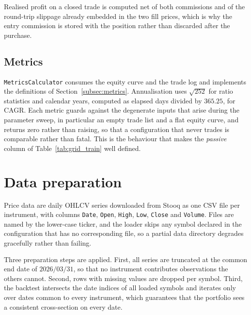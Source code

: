 \begin{listing}[!htbp]
\inputminted[linenos, frame=single, breaklines, fontsize=\footnotesize]{python}{other/portfolio_buy.py}
\caption{Entry-side accounting in the portfolio simulator, including slippage, commission and the one-way buy tax.}
\label{lst:portfolio_buy}
\end{listing}

Realised profit on a closed trade is computed net of both commissions and of the round-trip slippage already embedded in the two fill prices, which is why the entry commission is stored with the position rather than discarded after the purchase.

\subsection{Metrics}\label{subsec:metrics_impl}

\texttt{MetricsCalculator} consumes the equity curve and the trade log and implements the definitions of Section~\ref{subsec:metrics}. Annualisation uses $\sqrt{252}$ for ratio statistics and calendar years, computed as elapsed days divided by $365.25$, for CAGR. Each metric guards against the degenerate inputs that arise during the parameter sweep, in particular an empty trade list and a flat equity curve, and returns zero rather than raising, so that a configuration that never trades is comparable rather than fatal. This is the behaviour that makes the \emph{passive} column of Table~\ref{tab:grid_train} well defined.

\section{Data preparation}\label{sec:data_pipeline}

Price data are daily OHLCV series downloaded from Stooq \cite{stooq} as one CSV file per instrument, with columns \texttt{Date}, \texttt{Open}, \texttt{High}, \texttt{Low}, \texttt{Close} and \texttt{Volume}. Files are named by the lower-case ticker, and the loader skips any symbol declared in the configuration that has no corresponding file, so a partial data directory degrades gracefully rather than failing.

Three preparation steps are applied. First, all series are truncated at the common end date of $2026/03/31$, so that no instrument contributes observations the others cannot. Second, rows with missing values are dropped per symbol. Third, the backtest intersects the date indices of all loaded symbols and iterates only over dates common to every instrument, which guarantees that the portfolio sees a consistent cross-section on every date.

